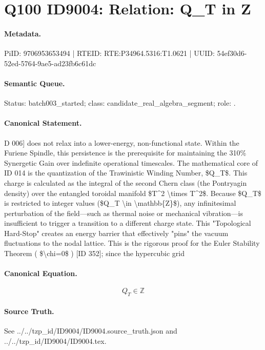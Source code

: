 \section*{Q100 ID9004: Relation: Q\_T in Z}
\paragraph{Metadata.}
PiID: 9706953653494 | RTEID: RTE:P34964.5316:T1.0621 | UUID: 54ef30d6-52ed-5764-9ae5-ad23fb6c61dc

\paragraph{Semantic Queue.}
Status: batch003\_started; class: candidate\_real\_algebra\_segment; role: .

\paragraph{Canonical Statement.}
D 006] does not relax into a lower-energy, non-functional state. Within the Furiene Spindle, this persistence is the prerequisite for maintaining the 310\% Synergetic Gain over indefinite operational timescales. The mathematical core of ID 014 is the quantization of the Trawinistic Winding Number, \$Q\_T\$. This charge is calculated as the integral of the second Chern class (the Pontryagin density) over the entangled toroidal manifold \$T\textasciicircum{}2 \textbackslash{}times T\textasciicircum{}2\$. Because \$Q\_T\$ is restricted to integer values (\$Q\_T \textbackslash{}in \textbackslash{}mathbb\{Z\}\$), any infinitesimal perturbation of the field—such as thermal noise or mechanical vibration—is insufficient to trigger a transition to a different charge state. This "Topological Hard-Stop" creates an energy barrier that effectively "pins" the vacuum fluctuations to the nodal lattice. This is the rigorous proof for the Euler Stability Theorem ( \$\textbackslash{}chi=0\$ ) [ID 352]; since the hypercubic grid

\paragraph{Canonical Equation.}
\[
Q_T \in \mathbb{Z}
\]

\paragraph{Source Truth.}
See ../../tzp\_id/ID9004/ID9004.source\_truth.json and ../../tzp\_id/ID9004/ID9004.tex.
